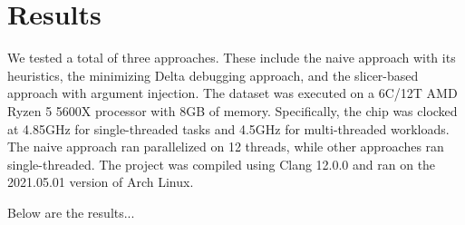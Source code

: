 \section{Results}

We tested a total of three approaches. 
These include the naive approach with its heuristics, the minimizing Delta 
debugging approach, and the slicer-based approach 
with argument injection. 
The dataset was executed on a 6C/12T AMD Ryzen 5 5600X processor with 8GB of 
memory. 
Specifically, the chip was clocked at 4.85GHz for single-threaded tasks and 
4.5GHz for multi-threaded workloads. 
The naive approach ran parallelized on 12 threads, while other approaches 
ran single-threaded. 
The project was compiled using Clang 12.0.0 and ran on the 2021.05.01 version 
of Arch Linux.

Below are the results...


